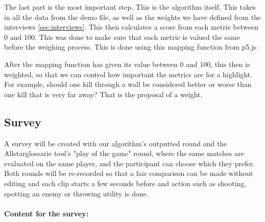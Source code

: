 The last part is the most important step. This is the algorithm itself. This takes in all the data from the demo file, as well as the weights we have defined from the interviews \ref{sec:interviews}. This then calculates a score from each metric between 0 and 100. This was done to make sure that each metric is valued the same before the weighing process. This is done using this mapping function from p5.js\cite{p5jsMap}

After the mapping function has given its value between 0 and 100, this then is weighted, so that we can control how important the metrics are for a highlight. For example, should one kill through a wall be considered better or worse than one kill that is very far away? That is the proposal of a weight. 

\subsection{Survey}
\label{sec:survey}
A survey will be created with our algorithm's outputted round and the Allstar{glossarie} tool's "play of the game" round, where the same matches are evaluated on the same player, and the participant can choose which they prefer. Both rounds will be re-recorded so that a fair comparison can be made without editing and each clip starts a few seconds before and action such as shooting, spotting an enemy or throwing utility is done.\\\\
\textbf {Content for the survey:}
